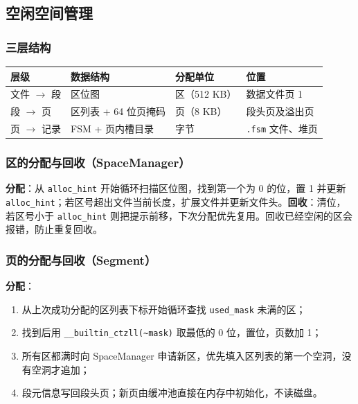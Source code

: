 \documentclass[11pt,a4paper]{ctexart}
\newcommand{\code}[1]{\texttt{#1}}
\begin{document}
\subsection{空闲空间管理}

\subsubsection{三层结构}

\begin{table}[H]
  \centering
  \begin{tabular}{l l l l}
    \toprule
    层级 & 数据结构 & 分配单位 & 位置 \\
    \midrule
    文件 $\rightarrow$ 段 & 区位图 & 区（512 KB） & 数据文件页 1 \\
    段 $\rightarrow$ 页 & 区列表 + 64 位页掩码 & 页（8 KB） & 段头页及溢出页 \\
    页 $\rightarrow$ 记录 & FSM + 页内槽目录 & 字节 & \code{.fsm} 文件、堆页 \\
    \bottomrule
  \end{tabular}
\end{table}

\subsubsection{区的分配与回收（SpaceManager）}

\textbf{分配}：从 \code{alloc\_hint} 开始循环扫描区位图，找到第一个为 0 的位，置 1 并更新 \code{alloc\_hint}；若区号超出文件当前长度，扩展文件并更新文件头。\textbf{回收}：清位，若区号小于 \code{alloc\_hint} 则把提示前移，下次分配优先复用。回收已经空闲的区会报错，防止重复回收。

\subsubsection{页的分配与回收（Segment）}

\textbf{分配}：
\begin{enumerate}
  \item 从上次成功分配的区列表下标开始循环查找 \code{used\_mask} 未满的区；
  \item 找到后用 \code{\_\_builtin\_ctzll(\textasciitilde mask)} 取最低的 0 位，置位，页数加 1；
  \item 所有区都满时向 SpaceManager 申请新区，优先填入区列表的第一个空洞，没有空洞才追加；
  \item 段元信息写回段头页；新页由缓冲池直接在内存中初始化，不读磁盘。
\end{enumerate}
\end{document}
